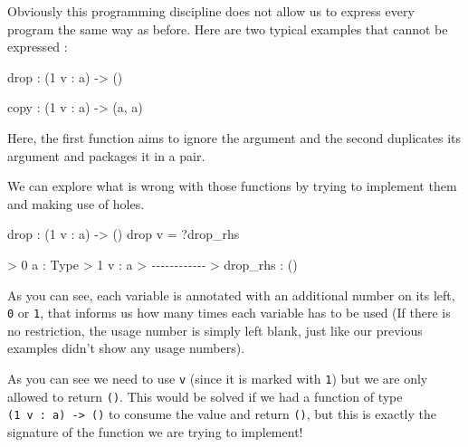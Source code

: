 \documentclass[
]{article}
\newenvironment{Shaded}{}{}
\newcommand{\CommentTok}[1]{\textcolor[rgb]{0.38,0.63,0.69}{\textit{#1}}}
\newcommand{\DataTypeTok}[1]{\textcolor[rgb]{0.56,0.13,0.00}{#1}}
\newcommand{\DecValTok}[1]{\textcolor[rgb]{0.25,0.63,0.44}{#1}}
\newcommand{\FunctionTok}[1]{\textcolor[rgb]{0.02,0.16,0.49}{#1}}
\newcommand{\NormalTok}[1]{#1}
\newcommand{\OperatorTok}[1]{\textcolor[rgb]{0.40,0.40,0.40}{#1}}
\newcommand{\OtherTok}[1]{\textcolor[rgb]{0.00,0.44,0.13}{#1}}
\begin{document}
Obviously this programming discipline does not allow us to express every
program the same way as before. Here are two typical examples that
cannot be expressed :

\begin{Shaded}
\begin{Highlighting}[]
\FunctionTok{drop} \OperatorTok{:}\NormalTok{ (}\DecValTok{1}\NormalTok{ v }\OperatorTok{:}\NormalTok{ a) }\OtherTok{{-}\textgreater{}}\NormalTok{ ()}

\NormalTok{copy }\OperatorTok{:}\NormalTok{ (}\DecValTok{1}\NormalTok{ v }\OperatorTok{:}\NormalTok{ a) }\OtherTok{{-}\textgreater{}}\NormalTok{ (a, a)}
\end{Highlighting}
\end{Shaded}

Here, the first function aims to ignore the argument and the second
duplicates its argument and packages it in a pair.

We can explore what is wrong with those functions by trying to implement
them and making use of holes.

\begin{Shaded}
\begin{Highlighting}[]
\FunctionTok{drop} \OperatorTok{:}\NormalTok{ (}\DecValTok{1}\NormalTok{ v }\OperatorTok{:}\NormalTok{ a) }\OtherTok{{-}\textgreater{}}\NormalTok{ ()}
\FunctionTok{drop}\NormalTok{ v }\OtherTok{=} \OperatorTok{?}\NormalTok{drop\_rhs}
\end{Highlighting}
\end{Shaded}

\begin{Shaded}
\begin{Highlighting}[]
\OperatorTok{\textgreater{}} \DecValTok{0}\NormalTok{ a }\OperatorTok{:} \DataTypeTok{Type}
\OperatorTok{\textgreater{}} \DecValTok{1}\NormalTok{ v }\OperatorTok{:}\NormalTok{ a}
\OperatorTok{\textgreater{}} \CommentTok{{-}{-}{-}{-}{-}{-}{-}{-}{-}{-}{-}{-}}
\OperatorTok{\textgreater{}}\NormalTok{ drop\_rhs }\OperatorTok{:}\NormalTok{ ()}
\end{Highlighting}
\end{Shaded}

As you can see, each variable is annotated with an additional number on
its left, \texttt{0} or \texttt{1}, that informs us how many times each
variable has to be used (If there is no restriction, the usage number is
simply left blank, just like our previous examples didn't show any usage
numbers).

As you can see we need to use \texttt{v} (since it is marked with
\texttt{1}) but we are only allowed to return \texttt{()}. This would be
solved if we had a function of type
\texttt{(1\ v\ :\ a)\ -\textgreater{}\ ()} to consume the value and
return \texttt{()}, but this is exactly the signature of the function we
are trying to implement!
\end{document}
